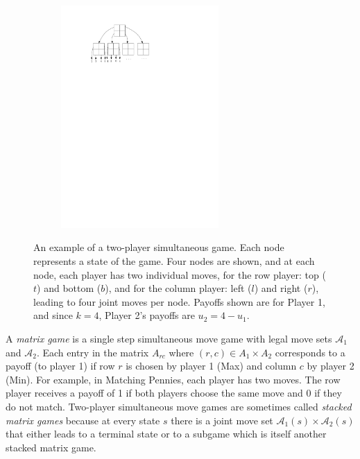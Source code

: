 \documentclass[conference]{IEEEtran}
\newcommand{\cA}{\mathcal{A}}
\begin{document}
\begin{figure}[t!]
\centering
\begin{subfigure}{6cm}
\centering
\includegraphics[width=6.0cm]{figures/tree2}\\
\end{subfigure}
\caption{An example of a two-player simultaneous game. Each node represents a state of 
the game. Four nodes are shown, and at each node, each player has two individual moves, for the row player: top ($t$) and bottom ($b$), 
and for the column player: left ($l$) and right ($r$), leading to four joint moves per node.
Payoffs shown are for Player 1, and since $k = 4$, Player 2's payoffs are $u_2 = 4 - u_1$. 
\label{fig:example}}
\end{figure}

A {\it matrix game} is a single step simultaneous move game with legal move sets $\cA_1$ and $\cA_2$. 
Each entry in the matrix $A_{rc}$ where $(r,c) \in A_1 \times A_2$ corresponds to a payoff (to player 1) if row $r$ is chosen by 
player 1 (Max) and column $c$ by player 2 (Min). 
For example, in Matching Pennies, each player has two moves. The row player receives a payoff of 1 if both 
players choose the same move and 0 if they do not match. 
Two-player simultaneous move games are sometimes called {\it stacked matrix games} because at every state 
$s$ there is a joint move set $\cA_1(s) \times \cA_2(s)$ that either leads to a terminal state or to a subgame which 
is itself another stacked matrix game. 
\end{document}

